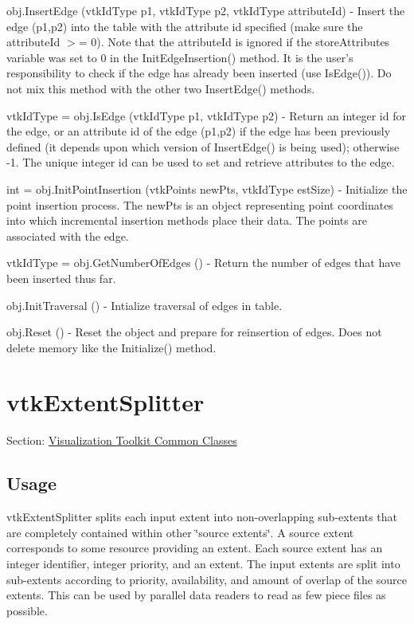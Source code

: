 \begin{DoxyItemize}
\item {\ttfamily obj.\-Insert\-Edge (vtk\-Id\-Type p1, vtk\-Id\-Type p2, vtk\-Id\-Type attribute\-Id)} -\/ Insert the edge (p1,p2) into the table with the attribute id specified (make sure the attribute\-Id $>$= 0). Note that the attribute\-Id is ignored if the store\-Attributes variable was set to 0 in the Init\-Edge\-Insertion() method. It is the user's responsibility to check if the edge has already been inserted (use Is\-Edge()). Do not mix this method with the other two Insert\-Edge() methods.  
\item {\ttfamily vtk\-Id\-Type = obj.\-Is\-Edge (vtk\-Id\-Type p1, vtk\-Id\-Type p2)} -\/ Return an integer id for the edge, or an attribute id of the edge (p1,p2) if the edge has been previously defined (it depends upon which version of Insert\-Edge() is being used); otherwise -\/1. The unique integer id can be used to set and retrieve attributes to the edge.  
\item {\ttfamily int = obj.\-Init\-Point\-Insertion (vtk\-Points new\-Pts, vtk\-Id\-Type est\-Size)} -\/ Initialize the point insertion process. The new\-Pts is an object representing point coordinates into which incremental insertion methods place their data. The points are associated with the edge.  
\item {\ttfamily vtk\-Id\-Type = obj.\-Get\-Number\-Of\-Edges ()} -\/ Return the number of edges that have been inserted thus far.  
\item {\ttfamily obj.\-Init\-Traversal ()} -\/ Intialize traversal of edges in table.  
\item {\ttfamily obj.\-Reset ()} -\/ Reset the object and prepare for reinsertion of edges. Does not delete memory like the Initialize() method.  
\end{DoxyItemize}\hypertarget{vtkcommon_vtkextentsplitter}{}\section{vtk\-Extent\-Splitter}\label{vtkcommon_vtkextentsplitter}
Section\-: \hyperlink{sec_vtkcommon}{Visualization Toolkit Common Classes} \hypertarget{vtkwidgets_vtkxyplotwidget_Usage}{}\subsection{Usage}\label{vtkwidgets_vtkxyplotwidget_Usage}
vtk\-Extent\-Splitter splits each input extent into non-\/overlapping sub-\/extents that are completely contained within other \char`\"{}source
 extents\char`\"{}. A source extent corresponds to some resource providing an extent. Each source extent has an integer identifier, integer priority, and an extent. The input extents are split into sub-\/extents according to priority, availability, and amount of overlap of the source extents. This can be used by parallel data readers to read as few piece files as possible.

